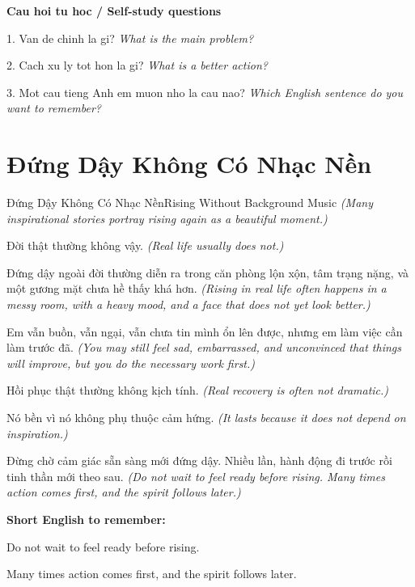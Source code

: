 \begin{tuhocnhanh}
\textbf{Cau hoi tu hoc / Self-study questions}

1. Van de chinh la gi? \textit{What is the main problem?}

2. Cach xu ly tot hon la gi? \textit{What is a better action?}

3. Mot cau tieng Anh em muon nho la cau nao? \textit{Which English sentence do you want to remember?}
\end{tuhocnhanh}
\ngancach

\section{Đứng Dậy Không Có Nhạc Nền}
\begin{truyen}{Đứng Dậy Không Có Nhạc Nền}{Rising Without Background Music}
\textit{(Many inspirational stories portray rising again as a beautiful moment.)}

Đời thật thường không vậy.
\textit{(Real life usually does not.)}

Đứng dậy ngoài đời thường diễn ra trong căn phòng lộn xộn, tâm trạng nặng, và một gương mặt chưa hề thấy khá hơn.
\textit{(Rising in real life often happens in a messy room, with a heavy mood, and a face that does not yet look better.)}

Em vẫn buồn, vẫn ngại, vẫn chưa tin mình ổn lên được, nhưng em làm việc cần làm trước đã.
\textit{(You may still feel sad, embarrassed, and unconvinced that things will improve, but you do the necessary work first.)}

Hồi phục thật thường không kịch tính.
\textit{(Real recovery is often not dramatic.)}

Nó bền vì nó không phụ thuộc cảm hứng.
\textit{(It lasts because it does not depend on inspiration.)}

\end{truyen}

\begin{baihoc}
Đừng chờ cảm giác sẵn sàng mới đứng dậy. Nhiều lần, hành động đi trước rồi tinh thần mới theo sau.
\textit{(Do not wait to feel ready before rising. Many times action comes first, and the spirit follows later.)}
\end{baihoc}

\begin{ghinhoanh}
\textbf{Short English to remember:}

Do not wait to feel ready before rising.

Many times action comes first, and the spirit follows later.

\end{ghinhoanh}

